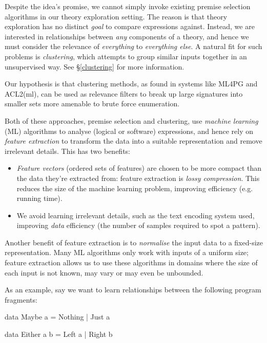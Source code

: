 Despite the idea's promise, we cannot simply invoke existing premise selection algorithms in our theory exploration setting. The reason is that theory exploration has no distinct \emph{goal} to compare expressions against. Instead, we are interested in relationships between \emph{any} components of a theory, and hence we must consider the relevance of \emph{everything} to \emph{everything else}. A natural fit for such problems is \emph{clustering}, which attempts to group similar inputs together in an unsupervised way. See \S \ref{clustering} for more information.

Our hypothesis is that clustering methods, as found in systems like ML4PG and ACL2(ml), can be used as relevance filters to break up large signatures into smaller sets more amenable to brute force enumeration.

Both of these approaches, premise selection and clustering, use \emph{machine learning} (ML) algorithms to analyse (logical or software) expressions, and hence rely on \emph{feature extraction} to transform the data into a suitable representation and remove irrelevant details. This has two benefits:

\begin{itemize}
  \item \emph{Feature vectors} (ordered sets of features) are chosen to be more compact than the data they're extracted from: feature extraction is \emph{lossy compression}. This reduces the size of the machine learning problem, improving efficiency (e.g. running time).
  \item We avoid learning irrelevant details, such as the text encoding system used, improving \emph{data} efficiency (the number of samples required to spot a pattern).
\end{itemize}

Another benefit of feature extraction is to \emph{normalise} the input data to a fixed-size representation. Many ML algorithms only work with inputs of a uniform size; feature extraction allows us to use these algorithms in domains where the size of each input is not known, may vary or may even be unbounded.

As an example, say we want to learn relationships between the following program fragments:

\begin{haskell}
data Maybe a = Nothing | Just a

data Either a b = Left a | Right b
\end{haskell}

